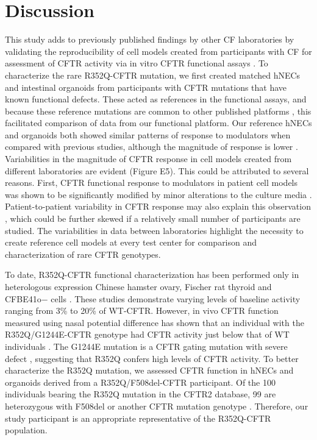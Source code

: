 \section{Discussion}
This study adds to previously published findings by other CF laboratories by validating the reproducibility of cell models created from participants with CF for assessment of CFTR activity via in vitro CFTR functional assays \cite{dekkers2016, ramalho2021}. To characterize the rare R352Q-CFTR mutation, we first created matched hNECs and intestinal organoids from participants with CFTR mutations that have known functional defects. These acted as references in the functional assays, and because these reference mutations are common to other published platforms \cite{dekkers2016, ramalho2021}, this facilitated comparison of data from our functional platform. Our reference hNECs and organoids both showed similar patterns of response to modulators when compared with previous studies, although the magnitude of response is lower \cite{dekkers2016, ramalho2021, pranke2017, pranke2019a}. Variabilities in the magnitude of CFTR response in cell models created from different laboratories are evident (Figure E5). This could be attributed to several reasons. First, CFTR functional response to modulators in patient cell models was shown to be significantly modified by minor alterations to the culture media \cite{gentzsch2017, saint-criq2020}. Patient-to-patient variability in CFTR response may also explain this observation \cite{pranke2017, matthes2018, brewington2018}, which could be further skewed if a relatively small number of participants are studied. The variabilities in data between laboratories highlight the necessity to create reference cell models at every test center for comparison and characterization of rare CFTR genotypes.

To date, R352Q-CFTR functional characterization has been performed only in heterologous expression Chinese hamster ovary, Fischer rat thyroid and CFBE41o− cells \cite{guinamard1999, vangoor2014,veit2020 }. These studies demonstrate varying levels of baseline activity ranging from 3\% to 20\% of WT-CFTR. However, in vivo CFTR function measured using nasal potential difference has shown that an individual with the R352Q/G1244E-CFTR genotype had CFTR activity just below that of WT individuals \cite{pranke2017}. The G1244E mutation is a CFTR gating mutation with severe defect \cite{cftr2}, suggesting that R352Q confers high levels of CFTR activity. To better characterize the R352Q mutation, we assessed CFTR function in hNECs and organoids derived from a R352Q/F508del-CFTR participant. Of the 100 individuals bearing the R352Q mutation in the CFTR2 database, 99 are heterozygous with F508del or another CFTR mutation genotype \cite{cftr2}. Therefore, our study participant is an appropriate representative of the R352Q-CFTR population.

